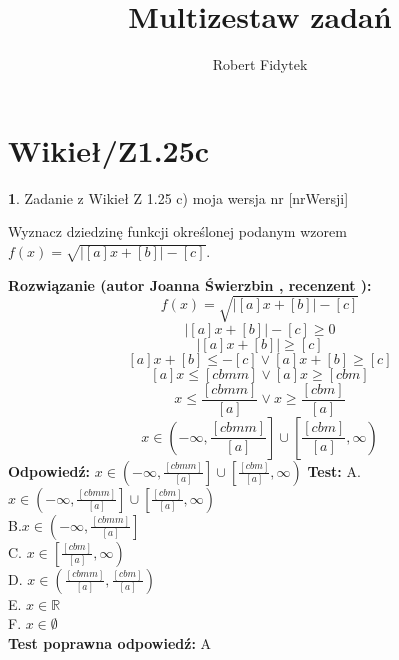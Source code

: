 \documentclass[12pt, a4paper]{article}
\title{Multizestaw zadań}
\author{Robert Fidytek}
\date{}
\theoremstyle{definition} %
\newtheorem{zad}{}
\newcommand{\kategoria}[1]{\section{#1}} %
\newcommand{\zadStart}[1]{\begin{zad}#1\newline} %
\newcommand{\zadStop}{\end{zad}}   %
\newcommand{\rozwStart}[2]{\noindent \textbf{Rozwiązanie (autor #1 , recenzent #2): }\newline} %
\newcommand{\rozwStop}{\newline}                                            %
\newcommand{\odpStart}{\noindent \textbf{Odpowiedź:}\newline}    %
\newcommand{\odpStop}{\newline}                                             %
\newcommand{\testStart}{\noindent \textbf{Test:}\newline} %
\newcommand{\testStop}{\newline} %
\newcommand{\kluczStart}{\noindent \textbf{Test poprawna odpowiedź:}\newline} %
\newcommand{\kluczStop}{\newline} %
\begin{document}
\maketitle


\kategoria{Wikieł/Z1.25c}
\zadStart{Zadanie z Wikieł Z 1.25 c) moja wersja nr [nrWersji]}


Wyznacz dziedzinę funkcji określonej podanym wzorem  $f(x)=\sqrt{|[a]x+[b]|-[c]}$.
\zadStop
\rozwStart{Joanna Świerzbin}{}
$$f(x)=\sqrt{|[a]x+[b]|-[c]}$$
$$|[a]x+[b]|-[c] \geq 0$$
$$|[a]x+[b]| \geq [c]$$
$$[a]x+[b] \leq -[c] \vee [a]x+[b] \geq [c]$$
$$[a]x \leq [cbmm] \vee [a]x \geq [cbm]$$
$$x \leq \frac{[cbmm]}{[a]} \vee x \geq \frac{[cbm]}{[a]}$$
$$x \in \left( -\infty , \frac{[cbmm]}{[a]} \right] \cup \left[\frac{[cbm]}{[a]}, \infty \right)$$
\rozwStop
\odpStart
$x \in \left( -\infty , \frac{[cbmm]}{[a]} \right] \cup \left[\frac{[cbm]}{[a]}, \infty \right)$
\odpStop
\testStart
A.$x \in \left( -\infty , \frac{[cbmm]}{[a]} \right] \cup \left[\frac{[cbm]}{[a]}, \infty \right)$\\
B.$x \in \left( -\infty , \frac{[cbmm]}{[a]} \right]$ \\
C. $x \in  \left[\frac{[cbm]}{[a]}, \infty \right)$\\
D. $x \in \left(\frac{[cbmm]}{[a]} , \frac{[cbm]}{[a]} \right)$\\
E. $x \in \mathbb{R}$\\
F. $x \in \emptyset $\\
\testStop
\kluczStart
A
\kluczStop
\end{document}
